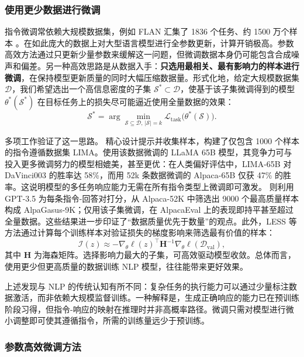 \subsubsection{使用更少数据进行微调}

指令微调常依赖大规模数据集，例如 FLAN 汇集了 1836 个任务、约 1500 万个样本 \cite{longpre-etal:2023flan}。在如此庞大的数据上对大型语言模型进行全参数更新，计算开销极高。参数高效方法通过只更新少量参数来缓解这一问题，但微调数据本身仍可能包含合成噪声和偏差。另一种高效思路是从数据入手：\textbf{只选用最相关、最有影响力的样本进行微调}，在保持模型更新质量的同时大幅压缩数据量。形式化地，给定大规模数据集 $\mathcal{D}$，我们希望选出一个高信息密度的子集 $\mathcal{S}^* \subset \mathcal{D}$，使基于该子集微调得到的模型 $\theta^*(\mathcal{S}^*)$ 在目标任务上的损失尽可能逼近使用全量数据的效果：
\begin{equation}
\mathcal{S}^* = \arg\min_{\mathcal{S}\subseteq\mathcal{D},\,|\mathcal{S}|=k} \mathcal{L}_{\text{task}}\bigl(\theta^*(\mathcal{S})\bigr).
\end{equation}

多项工作验证了这一思路。\citet{zhou-etal:2023lima} 精心设计提示并收集样本，构建了仅包含 1000 个样本的指令遵循数据集 LIMA。使用该数据微调的 LLaMA 65B 模型，其竞争力可与投入更多微调努力的模型相媲美，甚至更优：在人类偏好评估中，LIMA-65B 对 DaVinci003 的胜率达 58\%，而用 52k 条数据微调的 Alpaca-65B 仅获 47\% 的胜率。这说明模型的多任务响应能力无需在所有指令类型上微调即可激发。\citet{chen-etal:2024alpagasus} 则利用 GPT-3.5 为每条指令-回答对打分，从 Alpaca-52K 中筛选出 9000 个最高质量样本构成 AlpaGasus-9K；仅用该子集微调，在 AlpacaEval 上的表现即持平甚至超过全量数据。这些结果进一步印证了“数据质量优先于数量”的观点。此外，LESS 等方法通过计算每个训练样本对验证损失的梯度影响来筛选最有价值的样本：
\begin{equation}
\mathcal{I}(z) \approx -\nabla_\theta \ell(z)^\top \mathbf{H}^{-1} \nabla_\theta \ell(\mathcal{D}_{\text{val}}),
\end{equation}
其中 $\mathbf{H}$ 为海森矩阵。选择影响力最大的子集，可高效驱动模型收敛。总体而言，使用更少但更高质量的数据训练 NLP 模型，往往能带来更好效果。

上述发现与 NLP 的传统认知有所不同：复杂任务的执行能力可以通过少量标注数据激活，而非依赖大规模监督训练。一种解释是，生成正确响应的能力已在预训练阶段习得，但指令-响应的映射在推理时并非高概率路径。微调只需对模型进行微小调整即可使其遵循指令，所需的训练量远少于预训练。

\subsubsection{参数高效微调方法}

